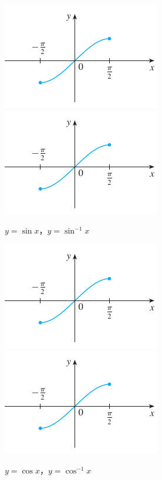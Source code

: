 \documentclass[12pt]{extarticle}
\theoremstyle{definition}
\begin{document}
\vspace{-1cm}
\begin{figure}[!htbp]
  \centering
  \includegraphics[scale=1.44,page=1]{fig/trig.pdf}
  \includegraphics[scale=1.2,page=2]{fig/trig.pdf}
  \caption{$y = \sin x$，$y = \sin^{-1} x$}
\end{figure}

\vspace{-1cm}
\begin{figure}[!htbp]
  \centering
  \includegraphics[scale=1.44,page=3]{fig/trig.pdf}
  \includegraphics[scale=1.2,page=4]{fig/trig.pdf}
  \caption{$y = \cos x$，$y = \cos^{-1} x$}
\end{figure}
\end{document}
